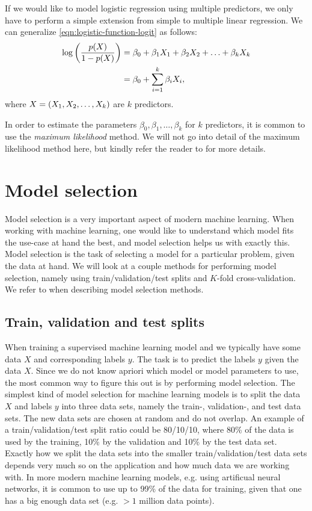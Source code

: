 If we would like to model logistic regression using multiple predictors, we only have to perform a simple extension from simple to multiple linear regression. We can generalize \cref{eqn:logistic-function-logit} as follows:
\begin{align}
    \log \left(\frac{p(X)}{1 - p(X)}\right)
    &= \beta_0 + \beta_1 X_1 + \beta_2 X_2 + \ldots + \beta_k X_k \\
    &= \beta_0 + \sum\limits_{i=1}^{k}{\beta_i X_i},
    \label{eqn:logistic-function-logit-multiple}
\end{align}
where $X = \left(X_1, X_2, \ldots, X_k\right)$ are $k$ predictors.

In order to estimate the parameters $\beta_0, \beta_1, \ldots, \beta_k$ for $k$ predictors, it is common to use the \textit{maximum likelihood} method. We will not go into detail of the maximum likelihood method here, but kindly refer the reader to \cite[p. 214]{fox2015applied} for more details.

\section{Model selection}
Model selection is a very important aspect of modern machine learning. When working with machine learning, one would like to understand which model fits the use-case at hand the best, and model selection helps us with exactly this. Model selection is the task of selecting a model for a particular problem, given the data at hand. We will look at a couple methods for performing model selection, namely using train/validation/test splits and $K$-fold cross-validation. We refer to \cite{James2013} when describing model selection methods.

\subsection{Train, validation and test splits}
\label{sec:train-val-test-splits}
When training a supervised machine learning model and  we typically have some data $X$ and corresponding labels $y$. The task is to predict the labels $y$ given the data $X$. Since we do not know apriori which model or model parameters to use, the most common way to figure this out is by performing model selection. The simplest kind of model selection for machine learning models is to split the data $X$ and labels $y$ into three data sets, namely the train-, validation-, and test data sets. The new data sets are chosen at random and do not overlap. An example of a train/validation/test split ratio could be 80/10/10, where 80\% of the data is used by the training, 10\% by the validation and 10\% by the test data set. Exactly how we split the data sets into the smaller train/validation/test data sets depends very much so on the application and how much data we are working with. In more modern machine learning models, e.g. using artificual neural networks, it is common to use up to 99\% of the data for training, given that one has a big enough data set (e.g. $>1$ million data points).

